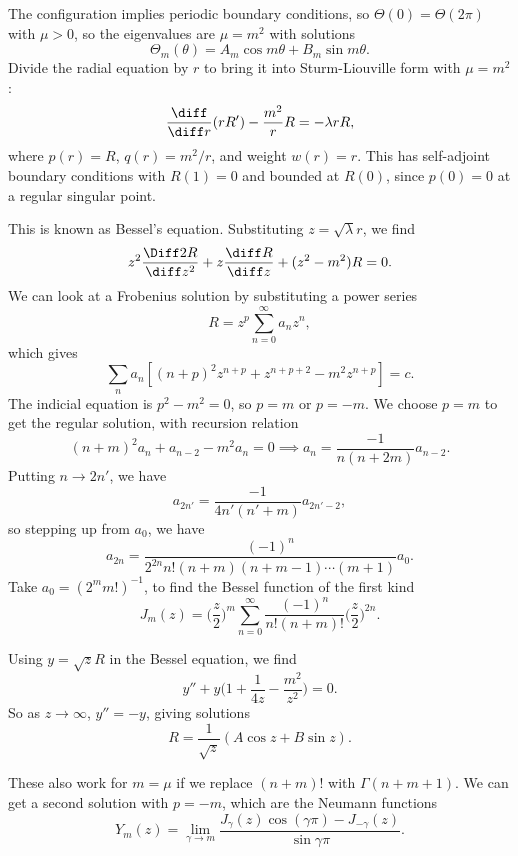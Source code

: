 \documentclass[12pt]{article}
\begin{document}
The configuration implies periodic boundary conditions, so $\Theta(0) = \Theta(2 \pi)$ with $\mu > 0$, so the eigenvalues are $\mu = m^2$ with solutions
\[
	\Theta_m(\theta) = A_m \cos m \theta + B_m \sin m \theta
.\]
Divide the radial equation by $r$ to bring it into Sturm-Liouville form with $\mu = m^2$:
\[
	\frac{\diff}{\diff r} (r R') - \frac{m^2}{r}R = - \lambda r R
,\]
where $p(r) = R$, $q(r) = m^2/r$, and weight $w(r) = r$. This has self-adjoint boundary conditions with $R(1) = 0$ and bounded at $R(0)$, since $p(0) = 0$ at a regular singular point.

This is known as Bessel's equation. Substituting $z = \sqrt{\lambda} r$, we find
\[
	z^2 \frac{\Diff2 R}{\diff z^2} + z \frac{\diff R}{\diff z} + (z^2 - m^2)R = 0
.\]
We can look at a Frobenius solution by substituting a power series
\[
R = z^{p} \sum_{n = 0}^{\infty} a_n z^{n}
,\]
which gives
\[
	\sum_{n} a_n[(n+p)^2 z^{n+p} + z^{n + p + 2} - m^2z^{n+p}] = c
.\]
The indicial equation is $p^2 - m^2 = 0$, so $p = m$ or $p = -m$. We choose $p = m$ to get the regular solution, with recursion relation
\[
	(n + m)^2 a_n + a_{n-2} - m^2a_n = 0 \implies a_n = \frac{-1}{n(n+2m)}a_{n-2}
.\]
Putting $n \to 2n'$, we have
\[
	a_{2n'} = \frac{-1}{4n'(n' + m)}a_{2n'-2}
,\]
so stepping up from $a_0$, we have
\[
	a_{2n} = \frac{(-1)^{n}}{2^{2n}n!(n+m)(n+m-1)\cdots(m+1)}a_0
.\]
Take $a_0 = (2^{m}m!)^{-1}$, to find the Bessel function of the first kind
\[
	J_m(z) = \biggl(\frac{z}{2}\biggr)^{m} \sum_{n = 0}^{\infty} \frac{(-1)^{n}}{n!(n+m)!} \biggl( \frac{z}{2} \biggr)^{2n}
.\]

\begin{exbox}
	Using $y = \sqrt z R$ in the Bessel equation, we find
	\[
		y'' + y \biggl( 1 + \frac{1}{4z} - \frac{m^2}{z^2} \biggr) = 0
	.\]
	So as $z \to \infty$, $y'' = -y$, giving solutions
	\[
		R = \frac{1}{\sqrt z}(A \cos z + B \sin z)
	.\]
\end{exbox}

These also work for $m = \mu$ if we replace $(n+m)!$ with $\Gamma(n+m+1)$. We can get a second solution with $p = -m$, which are the Neumann functions
\[
	Y_m(z) = \lim_{\gamma \to m} \frac{J_{\gamma}(z) \cos (\gamma \pi) - J_{-\gamma}(z)}{\sin \gamma \pi}
.\]
\end{document}
